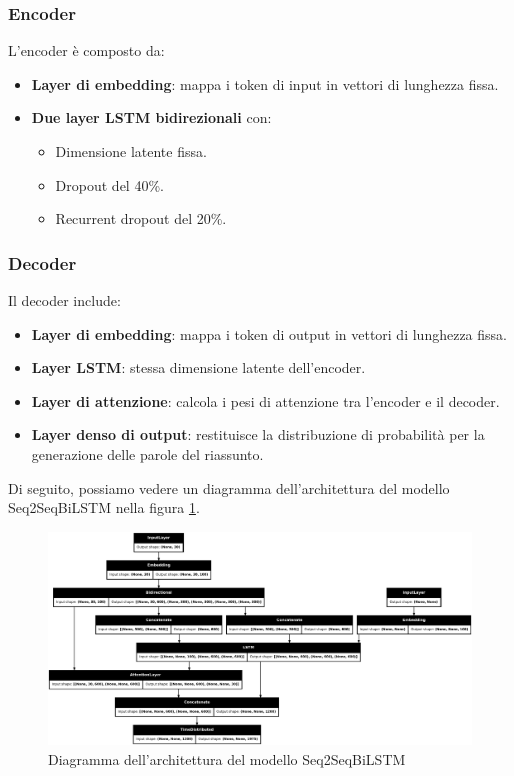 \documentclass[a4paper, 12pt]{article}
\begin{document}
\subsubsection{Encoder}
L'encoder è composto da:
\begin{itemize}
    \item \textbf{Layer di embedding}: mappa i token di input in vettori di lunghezza fissa.
    \item \textbf{Due layer LSTM bidirezionali} con:
        \begin{itemize}
            \item Dimensione latente fissa.
            \item Dropout del 40\%.
            \item Recurrent dropout del 20\%.
        \end{itemize}
\end{itemize}

\subsubsection{Decoder}
Il decoder include:
\begin{itemize}
    \item \textbf{Layer di embedding}: mappa i token di output in vettori di lunghezza fissa.
    \item \textbf{Layer LSTM}: stessa dimensione latente dell'encoder.
    \item \textbf{Layer di attenzione}: calcola i pesi di attenzione tra l'encoder e il decoder.
    \item \textbf{Layer denso di output}: restituisce la distribuzione di probabilità per la generazione delle parole del riassunto.
\end{itemize}

Di seguito, possiamo vedere un diagramma dell'architettura del modello Seq2SeqBiLSTM nella figura \ref{fig:biLSTM_model_architecture}.

\begin{figure}[H]
    \centering
    \includegraphics[width=1\textwidth]{media/Seq2SeqBiLSTM_image.png}
    \caption{Diagramma dell'architettura del modello Seq2SeqBiLSTM}
    \label{fig:biLSTM_model_architecture}
\end{figure}
\end{document}
